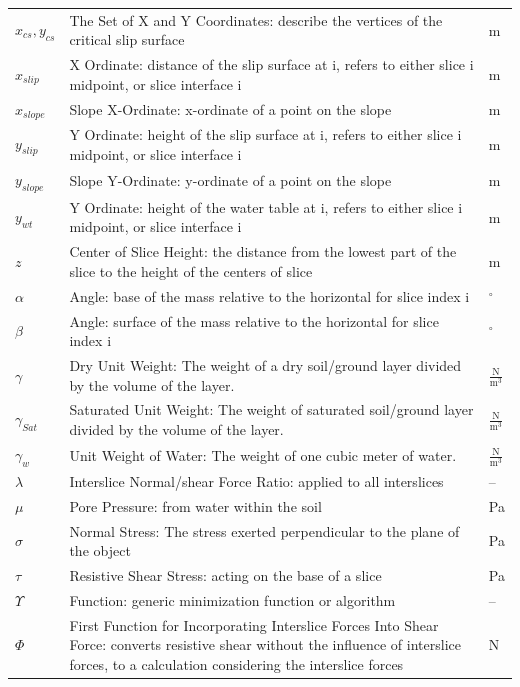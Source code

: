\documentclass[12pt]{article}
\begin{document}
\begin{longtabu}{l X[l] l}
\\
${x_{cs}},{y_{cs}}$ & The Set of X and Y Coordinates: describe the vertices of the critical slip surface & m
\\
${x_{slip}}$ & X Ordinate: distance of the slip surface at i, refers to either slice i midpoint, or slice interface i & m
\\
${x_{slope}}$ & Slope X-Ordinate: x-ordinate of a point on the slope & m
\\
${y_{slip}}$ & Y Ordinate: height of the slip surface at i, refers to either slice i midpoint, or slice interface i & m
\\
${y_{slope}}$ & Slope Y-Ordinate: y-ordinate of a point on the slope & m
\\
${y_{wt}}$ & Y Ordinate: height of the water table at i, refers to either slice i midpoint, or slice interface i & m
\\
$z$ & Center of Slice Height: the distance from the lowest part of the slice to the height of the centers of slice & m
\\
$α$ & Angle: base of the mass relative to the horizontal for slice index i & ${}^{\circ}$
\\
$β$ & Angle: surface of the mass relative to the horizontal for slice index i & ${}^{\circ}$
\\
$γ$ & Dry Unit Weight: The weight of a dry soil/ground layer divided by the volume of the layer. & $\frac{\text{N}}{\text{m}^{3}}$
\\
${γ_{Sat}}$ & Saturated Unit Weight: The weight of saturated soil/ground layer divided by the volume of the layer. & $\frac{\text{N}}{\text{m}^{3}}$
\\
${γ_{w}}$ & Unit Weight of Water: The weight of one cubic meter of water. & $\frac{\text{N}}{\text{m}^{3}}$
\\
$λ$ & Interslice Normal/shear Force Ratio: applied to all interslices & --
\\
$μ$ & Pore Pressure: from water within the soil & Pa
\\
$σ$ & Normal Stress: The stress exerted perpendicular to the plane of the object & Pa
\\
$τ$ & Resistive Shear Stress: acting on the base of a slice & Pa
\\
$Υ$ & Function: generic minimization function or algorithm & --
\\
$Φ$ & First Function for Incorporating Interslice Forces Into Shear Force: converts resistive shear without the influence of interslice forces, to a calculation considering the interslice forces & N

\end{longtabu}
\end{document}
